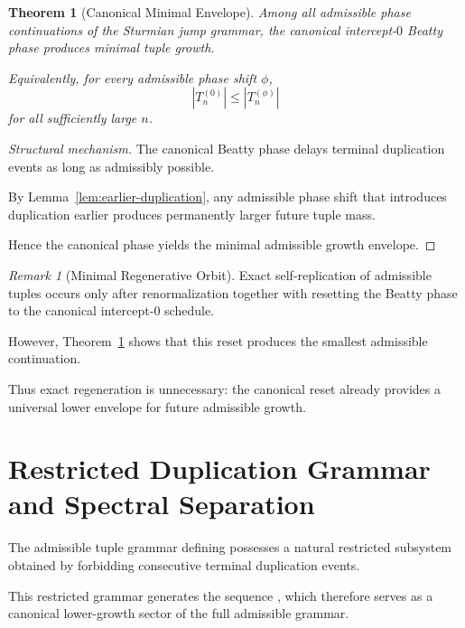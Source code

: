 \documentclass[12pt, oneside]{article}
\numberwithin{equation}{section}
\theoremstyle{definition}
\theoremstyle{plain}
\newtheorem{theorem}{Theorem}[section]
\theoremstyle{remark}
\newtheorem*{remark}{Remark}
\begin{document}
\begin{theorem}[Canonical Minimal Envelope]
\label{thm:minimal-envelope}
Among all admissible phase continuations of the Sturmian jump grammar,
the canonical intercept-$0$ Beatty phase produces minimal tuple growth.

Equivalently, for every admissible phase shift $\phi$,
\[
|T_n^{(0)}|
\le
|T_n^{(\phi)}|
\]
for all sufficiently large $n$.
\end{theorem}

\begin{proof}[Structural mechanism]
The canonical Beatty phase delays terminal duplication events
as long as admissibly possible.

By Lemma~\ref{lem:earlier-duplication}, any admissible phase shift
that introduces duplication earlier produces permanently larger
future tuple mass.

Hence the canonical phase yields the minimal admissible growth
envelope.
\end{proof}


\begin{remark}[Minimal Regenerative Orbit]
Exact self-replication of admissible tuples occurs only after
renormalization together with resetting the Beatty phase to the
canonical intercept-$0$ schedule.

However, Theorem~\ref{thm:minimal-envelope} shows that this reset
produces the smallest admissible continuation.

Thus exact regeneration is unnecessary:
the canonical reset already provides a universal lower envelope for
future admissible growth.
\end{remark}

\section{Restricted Duplication Grammar and Spectral Separation}
\label{sec:restricted-grammar}

The admissible tuple grammar defining  possesses a natural
restricted subsystem obtained by forbidding consecutive terminal
duplication events.

This restricted grammar generates the sequence , which
therefore serves as a canonical lower-growth sector of the full
admissible grammar.
\end{document}
